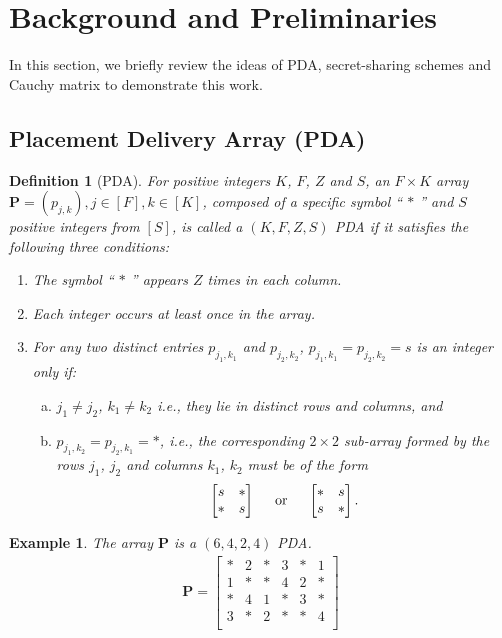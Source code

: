\documentclass[conference]{IEEEtran}
\newtheorem{defn}{Definition}
\newtheorem{exmp}{Example}
\begin{document}
\section{Background and Preliminaries}
\label{sec2}
In this section, we briefly review the ideas of PDA, secret-sharing schemes and Cauchy matrix to demonstrate this work.
\subsection{Placement Delivery Array (PDA)}
\label{sec2A}
\begin{defn}[PDA\cite{PDAmain}]
	\label{defPDA}
	For positive integers $K$, $F$, $Z$ and $S$, an $F\times K$ array $\mathbf{P}=(p_{j,k}), j\in[F], k\in[K]$, composed of a specific symbol `` $*$ '' and $S$ positive integers from $[S]$, is called a $(K,F,Z,S)$ PDA if it satisfies the following three conditions:
	\begin{enumerate}[C1.]
		\item The symbol `` $*$ '' appears $Z$ times in each column.
		\item Each integer occurs at least once in the array.
		\item For any two distinct entries $p_{j_1,k_1}$ and $p_{j_2,k_2}$, $p_{j_1,k_1}=p_{j_2,k_2}=s$ is an integer only if:
		\begin{enumerate}[a.]
			\item $j_1\neq j_2$, $k_1\neq k_2$ i.e., they lie in distinct rows and columns, and
			\item $p_{j_1,k_2}=p_{j_2,k_1}=*$, i.e., the corresponding $2\times 2$ sub-array formed by the rows $j_1$, $j_2$ and columns $k_1$, $k_2$ must be of the form
			\begin{align*}
			\begin{bmatrix}
			s & *\\ 
			* & s
			\end{bmatrix} \hspace{5 mm}\mbox{or}\hspace{5 mm}
			\begin{bmatrix}
			* & s\\
			s & *
			\end{bmatrix}.
			\end{align*}
		\end{enumerate}
	\end{enumerate}
	
\end{defn}
\begin{exmp}
\label{ex1}
The array $\mathbf{P}$  is a $(6,4,2,4)$ PDA.
	\begin{align}
	\label{pdaex}
	\mathbf{P}=
	\begin{bmatrix}
	* & 2 & * & 3 & * & 1\\
	1 & * & * & 4 & 2 & *\\
	* & 4 & 1 & * & 3 & *\\
	3 & * & 2 & * & * & 4\\
	\end{bmatrix}
	\end{align}
\end{exmp}
\end{document}
